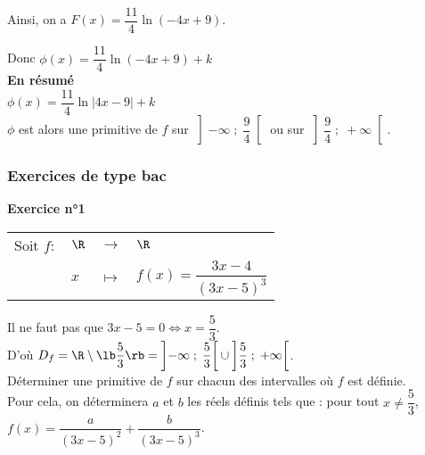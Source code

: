 \begin{itemize}
Ainsi, on a $F(x) = \dfrac{11}{4}\ln\left(-4x+9\right)$.

\vspace*{.3cm}

Donc $\phi\left(x\right) = \dfrac{11}{4}\ln\left(-4x+9\right) + k$ \\

\textbf{En résumé} \\

$\phi\left(x\right) = \dfrac{11}{4}\ln\vert 4x-9 \vert + k$ \\

$\phi$ est alors une primitive de $f$ sur $\left]-\infty \; ; \; \dfrac{9}{4}\right[$ ou sur $\left]\dfrac{9}{4} \; ; \; +\infty\right[$. 

\vspace*{-5cm}

\end{itemize}

\newpage

\vspace*{-2cm}

\subsubsection{Exercices de type bac}

\textbf{Exercice n°1} \\

\begin{tabular}{llll}
\hspace*{-.3cm} Soit $f:$ & $\R$ & $\longrightarrow$ & $\R$ \\
& $x$ & $\longmapsto$ & $f(x) = \dfrac{3x-4}{\left(3x-5\right)^3}$ \\
\end{tabular}

\vspace*{.3cm}

Il ne faut pas que $3x - 5 = 0 \Longleftrightarrow x = \dfrac{5}{3}$. \\

D'où $D_f = \R \setminus \lb \dfrac{5}{3} \rb = \left]-\infty \; ; \; \dfrac{5}{3} \right[ \cup \left] \dfrac{5}{3} \; ; \; +\infty \right[$. \\

Déterminer une primitive de $f$ sur chacun des intervalles où $f$ est définie. \\

Pour cela, on déterminera $a$ et $b$ les réels définis tels que : pour tout $x \neq \dfrac{5}{3}$, $f(x) = \dfrac{a}{\left(3x - 5\right)^2} + \dfrac{b}{\left(3x-5\right)^3}$. \vspace*{.3cm} \\

